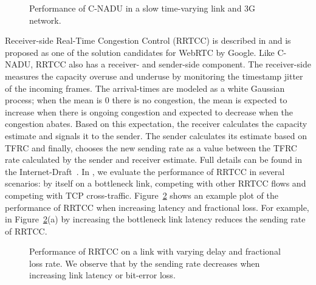 \begin{figure}
  \centerline{
  }
  \caption{Performance of C-NADU in a slow time-varying link and 3G network.}
  \label{fig:cnadu}
\end{figure}

Receiver-side Real-Time Congestion Control (RRTCC) is described in
\cite{draft.rrtcc} and is proposed as one of the solution candidates for
WebRTC by Google. Like C-NADU, RRTCC also has a receiver- and sender-side
component. The receiver-side measures the capacity overuse and underuse by
monitoring the timestamp jitter of the incoming frames. The arrival-times are
modeled as a white Gaussian process; when the mean is 0 there is no
congestion, the mean is expected to increase when there is ongoing congestion
and expected to decrease when the congestion abates. Based on this
expectation, the receiver calculates the capacity estimate and signals it to
the sender. The sender calculates its estimate based on TFRC and finally,
chooses the new sending rate as a value between the TFRC rate calculated by
the sender and receiver estimate. Full details can be found in the
Internet-Draft~\cite{draft.rrtcc}. In , we evaluate the
performance of RRTCC in several scenarios: by itself on a bottleneck link,
competing with other RRTCC flows and competing with TCP cross-traffic.
Figure~\ref{fig:rrtcc} shows an example plot of the performance of RRTCC when
increasing latency and fractional loss. For example, in
Figure~\ref{fig:rrtcc}(a) by increasing the bottleneck link latency reduces
the sending rate of RRTCC.

\begin{figure}
  \centerline{
   }
   \centerline{
  }
  \caption{Performance of RRTCC on a link with varying delay and fractional
  loss rate. We observe that by the sending rate decreases when increasing
  link latency or bit-error loss. }
  \label{fig:rrtcc}
\end{figure}

% 
